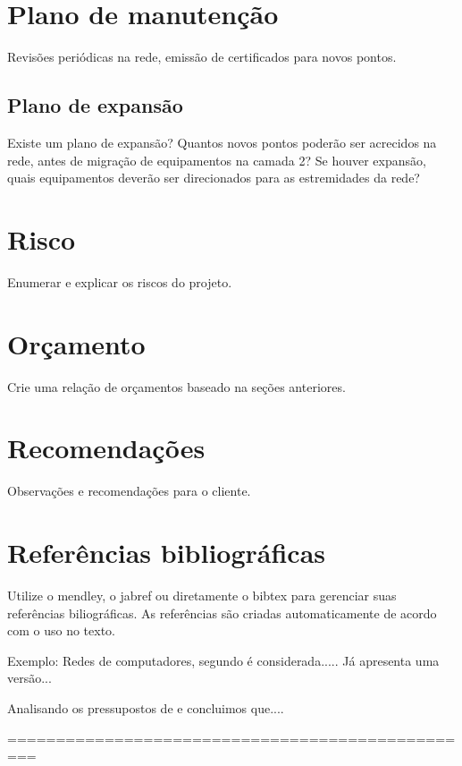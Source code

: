 \documentclass[	DIV=calc,%
							paper=a4,%
							fontsize=12pt,%
							onecolumn]{scrartcl}	 					%
\begin{document}
\section{Plano de manutenção}

Revisões periódicas na rede, emissão de certificados para novos pontos.

\subsection{Plano de expansão}
Existe um plano de expansão? Quantos novos pontos poderão ser acrecidos na rede, antes de migração de equipamentos na camada 2? Se houver expansão, quais equipamentos deverão ser direcionados para as estremidades da rede? 

\section{Risco}
Enumerar e explicar os riscos do projeto.

\section{Orçamento}
Crie uma relação de orçamentos baseado na seções anteriores.

\section{Recomendações}
Observações e recomendações para o cliente.

\section{Referências bibliográficas}
Utilize o mendley, o jabref ou diretamente o bibtex para gerenciar suas referências biliográficas. As referências são criadas automaticamente de acordo com o uso no texto.

Exemplo: Redes de computadores, segundo \cite{t2013} é considerada..... Já \cite{kurose2010} apresenta uma versão...

Analisando os pressupostos de \cite{ref3} e \cite{ref4} concluimos que....


\renewcommand\refname{} %

  

=================================================
\end{document}
